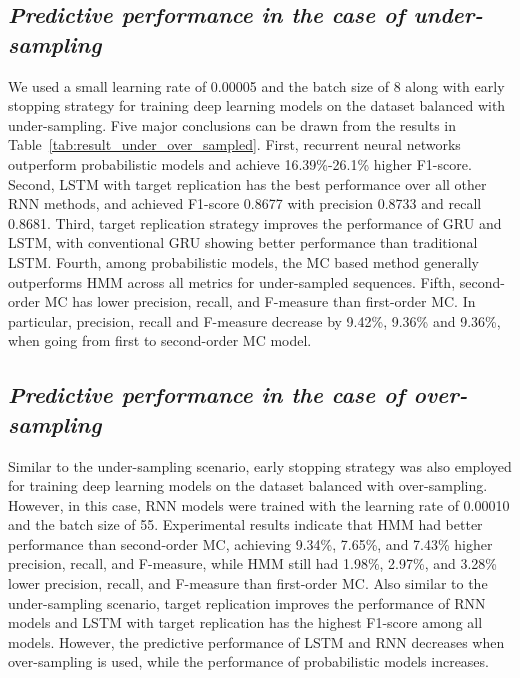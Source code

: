\documentclass{amia_summit_2018}
\begin{document}
\subsection*{\textit{Predictive performance in the case of under-sampling}}
We used a small learning rate of 0.00005 and the batch size of 8 along with early stopping strategy for training deep learning models on the dataset balanced with under-sampling. Five major conclusions can be drawn from the results in Table~\ref{tab:result_under_over_sampled}. First, recurrent neural networks outperform probabilistic models and achieve 16.39\%-26.1\% higher F1-score. Second, LSTM with target replication has the best performance over all other RNN methods, and achieved F1-score 0.8677 with precision 0.8733 and recall 0.8681. Third, target replication strategy improves the performance of GRU and LSTM, with conventional GRU showing better performance than traditional LSTM. Fourth, among probabilistic models, the MC based method generally outperforms HMM across all metrics for under-sampled sequences. Fifth, second-order MC has lower precision, recall, and F-measure than first-order MC. In particular, precision, recall and F-measure decrease by 9.42\%, 9.36\% and 9.36\%, when going from first to second-order MC model.

\subsection*{\textit{Predictive performance in the case of over-sampling}}
Similar to the under-sampling scenario, early stopping strategy was also employed for training deep learning models on the dataset balanced with over-sampling. However, in this case, RNN models were trained with the learning rate of 0.00010 and the batch size of 55. Experimental results indicate that HMM had better performance than second-order MC, achieving 9.34\%, 7.65\%, and 7.43\% higher precision, recall, and F-measure, while HMM still had 1.98\%,
2.97\%, and 3.28\% lower precision, recall, and F-measure than first-order MC. Also similar to the under-sampling scenario, target replication improves the performance of RNN models and LSTM with target replication has the highest F1-score among all models. However, the predictive performance of LSTM and RNN decreases when over-sampling is used, while the performance of probabilistic models increases.
\end{document}
